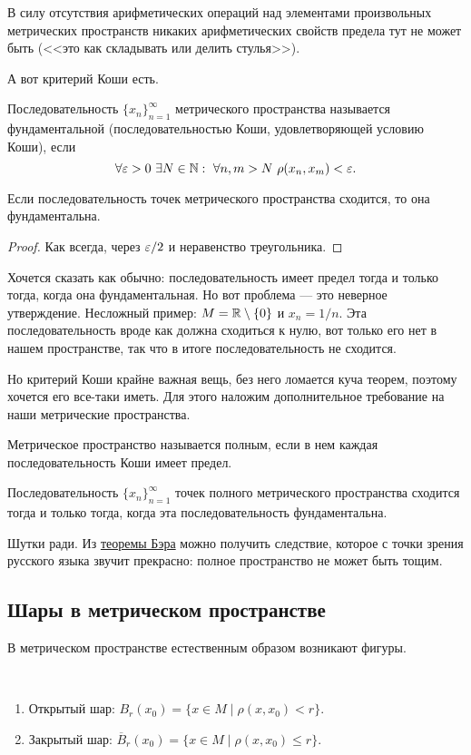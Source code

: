 В силу отсутствия арифметических операций над элементами произвольных метрических пространств никаких арифметических свойств предела тут не может быть (<<это как складывать или делить стулья>>).

А вот критерий Коши есть.
\begin{Def}
Последовательность $\{x_n\}_{n=1}^\infty$ метрического пространства называется фундаментальной (последовательностью Коши, удовлетворяющей условию Коши), если
$$
\forall \varepsilon > 0 \ \exists N \in \mathbb{N}:\ \forall n, m > N\ \rho(x_n, x_m) < \varepsilon.
$$
\end{Def}
\begin{Statement}
	Если последовательность точек метрического пространства сходится, то она фундаментальна.
\end{Statement}
\begin{proof}
	 Как всегда, через $\varepsilon/2$ и неравенство треугольника.
\end{proof}
Хочется сказать как обычно: последовательность имеет предел тогда и только тогда, когда она фундаментальная. Но вот проблема --- это неверное утверждение. Несложный пример: $M = \mathbb{R}\setminus\{0\}$ и $x_n = 1/n$. Эта последовательность вроде как должна сходиться к нулю, вот только его нет в нашем пространстве, так что в итоге последовательность не сходится.

Но критерий Коши крайне важная вещь, без него ломается куча теорем, поэтому хочется его все-таки иметь. Для этого наложим дополнительное требование на наши метрические пространства.
\begin{Def}
Метрическое пространство называется полным, если в нем каждая последовательность Коши имеет предел.
\end{Def}

\begin{Theorem}
Последовательность $\{x_n\}_{n=1}^\infty$ точек полного метрического пространства сходится тогда и только тогда, когда эта последовательность фундаментальна.
\end{Theorem}

\begin{Comment}
Шутки ради. Из \href{https://goo.gl/drRQz0}{теоремы Бэра} можно получить следствие, которое с точки зрения русского языка звучит прекрасно: полное пространство не может быть тощим.
\end{Comment}

\subsection{Шары в метрическом пространстве}
В метрическом пространстве естественным образом возникают фигуры.
\begin{Def}\ 
\begin{enumerate}
\item Открытый шар: $B_r(x_0) = \{x \in M \mid \rho(x, x_0) < r  \}$.
\item Закрытый шар: $\overline{B}_r(x_0) = \{x \in M \mid \rho(x, x_0) \leq r  \}$.
\end{enumerate}
\end{Def}

